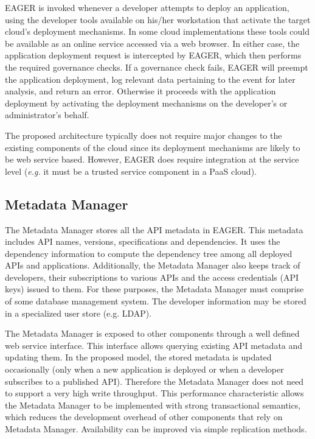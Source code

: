 EAGER is invoked whenever a developer attempts to deploy an application, using
the developer tools available on his/her workstation that activate the target
cloud's deployment mechanisms. In some cloud
implementations these tools could be available as an online service accessed
via a web browser. In either case, the application deployment request is
intercepted by EAGER, which then performs the required governance checks.
If a governance check fails, EAGER will preempt the application deployment,
log relevant data pertaining to the event for later analysis,  and
return an error. Otherwise it proceeds with the application deployment by
activating the deployment mechanisms on the developer's or administrator's
behalf.

The proposed architecture typically does not require major changes to the 
existing components of the cloud since its deployment mechanisms are likely to
be web service based.  However, EAGER does require integration at the service level
({\em e.g.} it must be a trusted service component in a PaaS cloud). 

\subsection{Metadata Manager}
The Metadata Manager stores all the API metadata in EAGER. This metadata 
includes API names, versions, specifications and dependencies.
It uses the dependency information to compute the dependency tree 
among 
all deployed APIs and applications. Additionally, the Metadata Manager
also keeps track of developers, their subscriptions to various APIs and the access credentials (API keys) issued to them. For these purposes,
the Metadata Manager must comprise of some database management system. The developer information may be stored in a specialized user
store (e.g. LDAP).

The Metadata Manager is exposed to other components through a well defined web service interface.
This interface allows querying existing API metadata and updating them. In the proposed model, the stored metadata is updated 
occasionally (only when a new application is deployed or when a developer subscribes to a published API). Therefore the Metadata Manager
does not need to support a very high write throughput. This performance
characteristic allows the Metadata Manager to be implemented with strong 
transactional semantics,
which reduces the development overhead of other components that rely on Metadata Manager. Availability can be improved via
simple replication methods.

